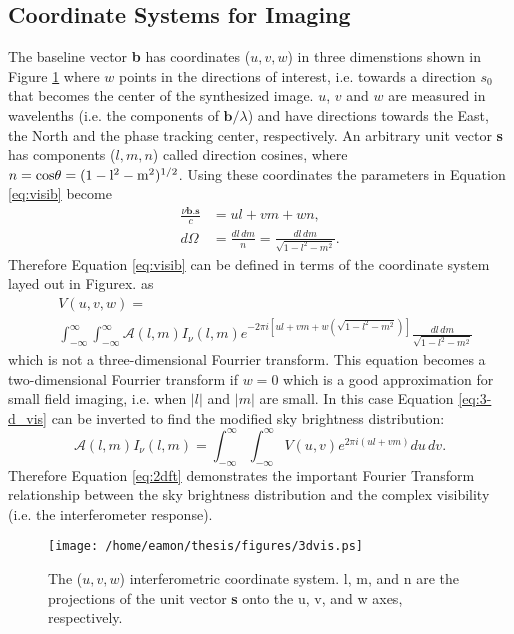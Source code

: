 \subsection{Coordinate Systems for Imaging}\label{subsec:7}
The baseline vector \textbf{b} has coordinates ($u,v,w$) in three dimenstions shown in Figure \ref{fig2h} where $w$ points in the directions of interest, i.e. towards a direction \textbf{$s_{0}$} that becomes the center of the synthesized image. $u$, $v$ and $w$ are measured in wavelenths (i.e. the components of $\textbf{b}/\lambda$) and have directions towards the East, the North and the phase tracking center, respectively. An arbitrary unit vector \textbf{s} has components ($l,m,n$) called direction cosines, where $n=\rm{cos}\theta=(1-l^2-m^2)^{1/2}$. Using these coordinates the parameters in Equation \ref{eq:visib} become
\begin{equation}
\begin{split}
\frac{\nu \textbf{b}.\textbf{s}}{c}&=ul+vm+wn, \\
d\Omega &= \frac{dl\,dm}{n}=\frac{dl\,dm}{\sqrt{1-l^2-m^2}}.
\end{split}
\end{equation}
Therefore Equation \ref{eq:visib} can be defined in terms of the coordinate system layed out in Figure{x.} as
\begin{equation}\label{eq:3-d_vis}
\begin{split}
&V(u,v,w)=\\
&\int ^{\infty}_{-\infty}\int ^{\infty}_{-\infty} \mathcal{A}(l,m)I_{\nu}(l,m)\mathit{e}^{-2\pi \mathit{i}[ul+vm+w(\sqrt{1-l^2-m^2})] }\frac{dl\,dm}{\sqrt{1-l^2-m^2}}
\end{split}
\end{equation}
which is not a three-dimensional Fourrier transform. This equation becomes a two-dimensional Fourrier transform if $w=0$ which is a good approximation for small field imaging, i.e. when $|l|$ and $|m|$ are small. In this case Equation \ref{eq:3-d_vis} can be inverted to find the modified sky brightness distribution:
\begin{equation}\label{eq:2dft}
\mathcal{A}(l,m)I_{\nu}(l,m)=\int ^{\infty}_{-\infty}\int ^{\infty}_{-\infty}V(u,v)\mathit{e}^{2\pi \mathit{i}(ul+vm)}du\,dv.
\end{equation}
Therefore Equation \ref{eq:2dft} demonstrates the important Fourier Transform relationship between the sky brightness distribution and the complex visibility (i.e. the interferometer response).

\begin{figure}[hbt!]
\centering 
          \texttt{[image: /home/eamon/thesis/figures/3dvis.ps]}
\caption[The ($u,v,w$) interferometric coordinate system.]{The ($u,v,w$) interferometric coordinate system. l, m, and n are the projections of the unit vector \textbf{s} onto the u, v, and w axes, respectively.}
\label{fig2h}
\end{figure}

